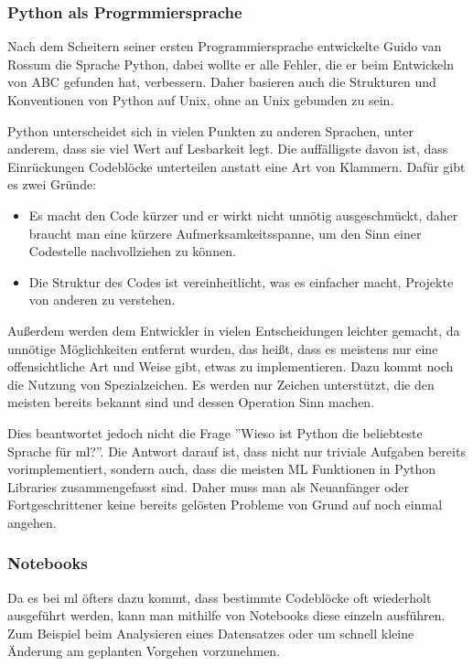 \subsubsection{Python als Progrmmiersprache}

Nach dem Scheitern seiner ersten Programmiersprache entwickelte Guido van Rossum die Sprache Python, dabei wollte er alle Fehler, die er beim Entwickeln von ABC gefunden hat, verbessern. Daher basieren auch die Strukturen und Konventionen von Python auf Unix, ohne an Unix gebunden zu sein. \cite{PythonGVR:online}

Python unterscheidet sich in vielen Punkten zu anderen Sprachen, unter anderem, dass sie viel Wert auf Lesbarkeit legt. Die auffälligste davon ist, dass Einrückungen Codeblöcke unterteilen anstatt eine Art von Klammern. Dafür gibt es zwei Gründe:

\begin{itemize}
    \item Es macht den Code kürzer und er wirkt nicht unnötig ausgeschmückt, daher braucht man eine kürzere Aufmerksamkeitsspanne, um den Sinn einer Codestelle nachvollziehen zu können.
    \item Die Struktur des Codes ist vereinheitlicht, was es einfacher macht, Projekte von anderen zu verstehen.
\end{itemize}

Außerdem werden dem Entwickler in vielen Entscheidungen leichter gemacht, da unnötige Möglichkeiten entfernt wurden, das heißt, dass es meistens nur eine offensichtliche Art und Weise gibt, etwas zu implementieren. Dazu kommt noch die Nutzung von Spezialzeichen. Es werden nur Zeichen unterstützt, die den meisten bereits bekannt sind und dessen Operation Sinn machen. \cite{PythonGVR:online}

Dies beantwortet jedoch nicht die Frage ''Wieso ist Python die beliebteste Sprache für \gls{ml}?''. Die Antwort darauf ist, dass nicht nur triviale Aufgaben bereits vorimplementiert, sondern auch, dass die meisten ML Funktionen in Python Libraries zusammengefasst sind. Daher muss man als Neuanfänger oder Fortgeschrittener keine bereits gelösten Probleme von Grund auf noch einmal angehen.

\subsubsection{Notebooks}

Da es bei \gls{ml} öfters dazu kommt, dass bestimmte Codeblöcke oft wiederholt ausgeführt werden, kann man mithilfe von Notebooks diese einzeln ausführen. Zum Beispiel beim Analysieren eines Datensatzes oder um schnell kleine Änderung am geplanten Vorgehen vorzunehmen.

